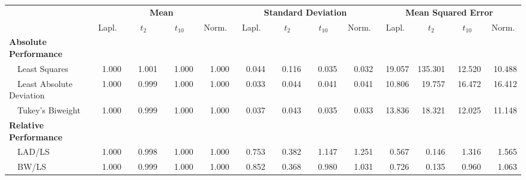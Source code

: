 %
\begin{center}
\begin{tabular}{|l||c|c|c|c||c|c|c|c||c|c|c|c|} \hline
\multicolumn{1}{|l||}{\bf }&\multicolumn{4}{c||}{\bf Mean}&\multicolumn{4}{c||}{\bf Standard Deviation}&\multicolumn{4}{c|}{\bf Mean Squared Error}\\ \cline{2-13}
\multicolumn{1}{|l||}{}&\multicolumn{1}{c|}{Lapl.}&\multicolumn{1}{c|}{$t_2$}&\multicolumn{1}{c|}{$t_{10}$}&\multicolumn{1}{c||}{Norm.}&\multicolumn{1}{c|}{Lapl.}&\multicolumn{1}{c|}{$t_2$}&\multicolumn{1}{c|}{$t_{10}$}&\multicolumn{1}{c||}{Norm.}&\multicolumn{1}{c|}{Lapl.}&\multicolumn{1}{c|}{$t_2$}&\multicolumn{1}{c|}{$t_{10}$}&\multicolumn{1}{c|}{Norm.}\\ \hline
{\bf Absolute Performance}&&&&&&&&&&&&\\
~~Least Squares&~~1.000&~~1.001&~~1.000&~~1.000&~~0.044&~~0.116&~~0.035&~~0.032&~19.057&135.301&~12.520&~10.488\\ 
~~Least Absolute Deviation&~~1.000&~~0.999&~~1.000&~~1.000&~~0.033&~~0.044&~~0.041&~~0.041&~10.806&~19.757&~16.472&~16.412\\ 
~~Tukey's Biweight&~~1.000&~~0.999&~~1.000&~~1.000&~~0.037&~~0.043&~~0.035&~~0.033&~13.836&~18.321&~12.025&~11.148\\ \hline
{\bf Relative Performance}&&&&&&&&&&&&\\
~~LAD/LS&~~1.000&~~0.998&~~1.000&~~1.000&~~0.753&~~0.382&~~1.147&~~1.251&~~0.567&~~0.146&~~1.316&~~1.565\\ 
~~BW/LS&~~1.000&~~0.999&~~1.000&~~1.000&~~0.852&~~0.368&~~0.980&~~1.031&~~0.726&~~0.135&~~0.960&~~1.063\\ 
\hline
\end{tabular}
\end{center}
